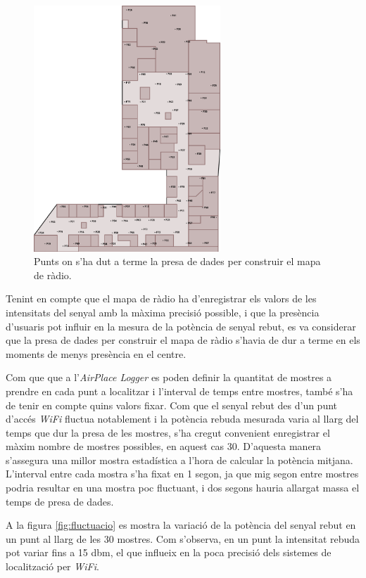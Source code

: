 \begin{figure}[ht]
\begin{center}
\includegraphics[width=7cm]{imatges/planol_log.png}
\caption{Punts on s'ha dut a terme la presa de dades per construir el mapa de ràdio.}
\label{fig:planol_log}
\end{center}
\end{figure}

Tenint en compte que el mapa de ràdio ha d'enregistrar els valors de les intensitats del senyal amb la màxima precisió possible, i que la presència d'usuaris pot influir en la mesura de la potència de senyal rebut, es va considerar que la presa de dades per construir el mapa de ràdio s'havia de dur a terme en els moments de menys presència en el centre.

Com que que a l'\textit{AirPlace Logger} es poden definir la quantitat de mostres a prendre en cada punt a localitzar i l'interval de temps entre mostres, també s'ha de tenir en compte quins valors fixar. Com que el senyal rebut des d'un punt d'accés \textit{WiFi} fluctua notablement i la potència rebuda mesurada varia al llarg del temps que dur la presa de les mostres, s'ha cregut convenient enregistrar el màxim nombre de mostres possibles, en aquest cas 30. D'aquesta manera s'assegura una millor mostra estadística a l'hora de calcular la potència mitjana. L'interval entre cada mostra s'ha fixat en 1 segon, ja que mig segon entre mostres podria resultar en una mostra poc fluctuant, i dos segons hauria allargat massa el temps de presa de dades.

A la figura \ref{fig:fluctuacio} es mostra la variació de la potència del senyal rebut en un punt al llarg de les 30 mostres. Com s'observa, en un punt la intensitat rebuda pot variar fins a 15 dbm, el que influeix en la poca precisió dels sistemes de localització per \textit{WiFi}.

